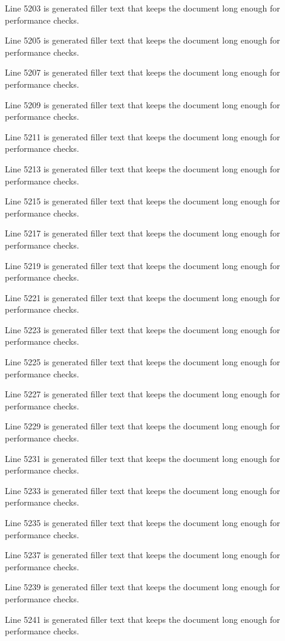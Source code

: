 Line 5203 is generated filler text that keeps the document long enough for performance checks.

Line 5205 is generated filler text that keeps the document long enough for performance checks.

Line 5207 is generated filler text that keeps the document long enough for performance checks.

Line 5209 is generated filler text that keeps the document long enough for performance checks.

Line 5211 is generated filler text that keeps the document long enough for performance checks.

Line 5213 is generated filler text that keeps the document long enough for performance checks.

Line 5215 is generated filler text that keeps the document long enough for performance checks.

Line 5217 is generated filler text that keeps the document long enough for performance checks.

Line 5219 is generated filler text that keeps the document long enough for performance checks.

Line 5221 is generated filler text that keeps the document long enough for performance checks.

Line 5223 is generated filler text that keeps the document long enough for performance checks.

Line 5225 is generated filler text that keeps the document long enough for performance checks.

Line 5227 is generated filler text that keeps the document long enough for performance checks.

Line 5229 is generated filler text that keeps the document long enough for performance checks.

Line 5231 is generated filler text that keeps the document long enough for performance checks.

Line 5233 is generated filler text that keeps the document long enough for performance checks.

Line 5235 is generated filler text that keeps the document long enough for performance checks.

Line 5237 is generated filler text that keeps the document long enough for performance checks.

Line 5239 is generated filler text that keeps the document long enough for performance checks.

Line 5241 is generated filler text that keeps the document long enough for performance checks.

